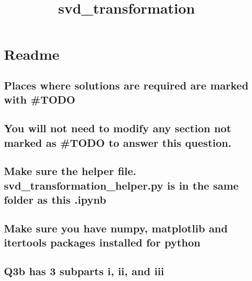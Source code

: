 \documentclass[11pt]{article}
\title{svd\_transformation}
\begin{document}
    
    
    \maketitle
    
    

    
    \hypertarget{readme}{%
\section{Readme}\label{readme}}

\hypertarget{places-where-solutions-are-required-are-marked-with-todo}{%
\subsection{Places where solutions are required are marked with
\#TODO}\label{places-where-solutions-are-required-are-marked-with-todo}}

\hypertarget{you-will-not-need-to-modify-any-section-not-marked-as-todo-to-answer-this-question.}{%
\subsection{You will not need to modify any section not marked as \#TODO
to answer this
question.}\label{you-will-not-need-to-modify-any-section-not-marked-as-todo-to-answer-this-question.}}

\hypertarget{make-sure-the-helper-file.-svd_transformation_helper.py-is-in-the-same-folder-as-this-.ipynb}{%
\subsection{Make sure the helper file. svd\_transformation\_helper.py is
in the same folder as this
.ipynb}\label{make-sure-the-helper-file.-svd_transformation_helper.py-is-in-the-same-folder-as-this-.ipynb}}

\hypertarget{make-sure-you-have-numpy-matplotlib-and-itertools-packages-installed-for-python}{%
\subsection{Make sure you have numpy, matplotlib and itertools packages
installed for
python}\label{make-sure-you-have-numpy-matplotlib-and-itertools-packages-installed-for-python}}

\hypertarget{q3b-has-3-subparts-i-ii-and-iii}{%
\subsection{Q3b has 3 subparts i, ii, and
iii}\label{q3b-has-3-subparts-i-ii-and-iii}}
\end{document}
